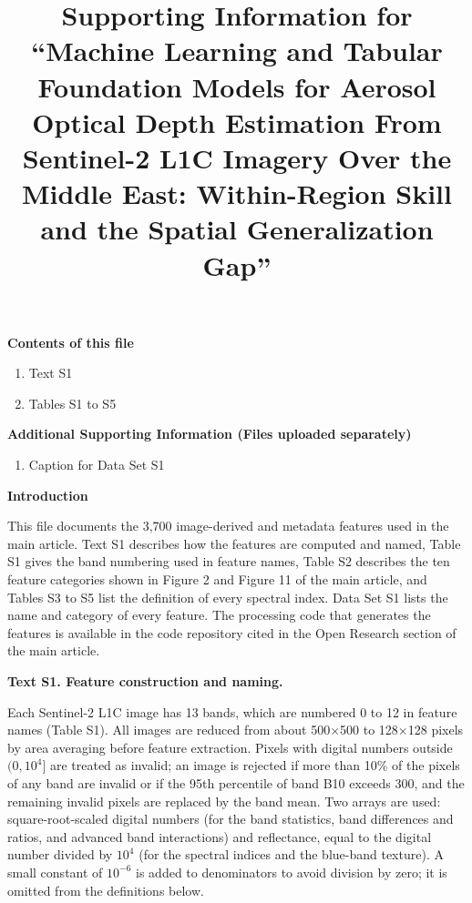 \documentclass[draft,ea]{agutexSI2019}
\begin{document}
\title{Supporting Information for ``Machine Learning and Tabular Foundation Models for Aerosol Optical Depth Estimation From Sentinel-2 L1C Imagery Over the Middle East: Within-Region Skill and the Spatial Generalization Gap''}
\begin{article}
\noindent\textbf{Contents of this file}
\begin{enumerate}
\item Text S1
\item Tables S1 to S5
\end{enumerate}
\noindent\textbf{Additional Supporting Information (Files uploaded separately)}
\begin{enumerate}
\item Caption for Data Set S1
\end{enumerate}

\noindent\textbf{Introduction}

This file documents the 3,700 image-derived and metadata features used in the main article. Text S1 describes how the features are computed and named, Table S1 gives the band numbering used in feature names, Table S2 describes the ten feature categories shown in Figure 2 and Figure 11 of the main article, and Tables S3 to S5 list the definition of every spectral index. Data Set S1 lists the name and category of every feature. The processing code that generates the features is available in the code repository cited in the Open Research section of the main article.

\noindent\textbf{Text S1. Feature construction and naming.}

Each Sentinel-2 L1C image has 13 bands, which are numbered 0 to 12 in feature names (Table S1). All images are reduced from about 500$\times$500 to 128$\times$128 pixels by area averaging before feature extraction. Pixels with digital numbers outside $(0,10^{4}]$ are treated as invalid; an image is rejected if more than 10\% of the pixels of any band are invalid or if the 95th percentile of band B10 exceeds 300, and the remaining invalid pixels are replaced by the band mean. Two arrays are used: square-root-scaled digital numbers (for the band statistics, band differences and ratios, and advanced band interactions) and reflectance, equal to the digital number divided by $10^{4}$ (for the spectral indices and the blue-band texture). A small constant of $10^{-6}$ is added to denominators to avoid division by zero; it is omitted from the definitions below.


\end{article}
\end{document}
